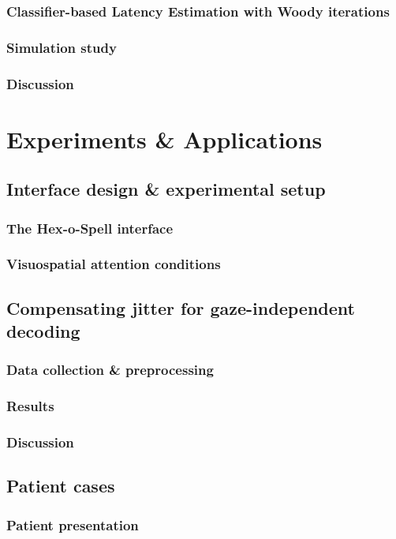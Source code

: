 \section{Classifier-based Latency Estimation with Woody iterations}
\section{Simulation study}
\section{Discussion}

\part{Experiments \& Applications}

\chapter{Interface design \& experimental setup}
\section{The Hex-o-Spell interface}
\section{Visuospatial attention conditions}

\chapter{Compensating jitter for gaze-independent decoding}
\section{Data collection \& preprocessing}
\section{Results}
\section{Discussion}

\chapter{Patient cases}
\section{Patient presentation}
